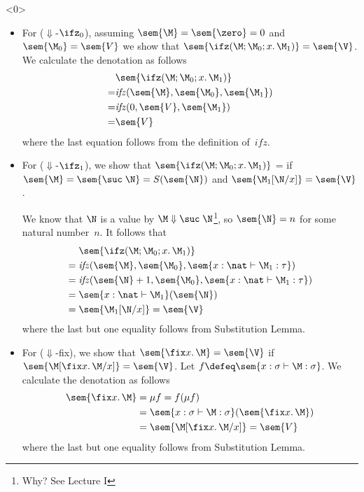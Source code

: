 \begin{frame}<0>
\begin{itemize}
  \item For ($\Downarrow$-$\ifz_0$), assuming $\sem{\M}=\sem{\zero} = 0$
    and $\sem{\M_0} = \sem{V}$ we show that
    $\sem{\ifz(\M; \M_0; x.\, \M_1)} = \sem{\V}$. We calculate the
    denotation as follows
    \begin{align*}
      & \sem{\ifz(\M;\M_0;x.\,\M_1)} \\
         = &\mathit{ifz}(\sem{\M}, \sem{\M_0}, \sem{\M_1}) \\
         = &\mathit{ifz}(0, \sem{V}, \sem{\M_1}) \\
         = &\sem{V}
    \end{align*}
    where the last equation follows from the definition of~$\mathit{ifz}$. 
  \item For ($\Downarrow$-$\ifz_1$), we show that $\sem{\ifz(\M;\M_0;
      x.\,\M_1)}$ =  if $\sem{\M} = \sem{\suc\;\N} = S(\sem{\N})$
    and $\sem{\M_1[\N/x]} = \sem{\V}$.

  We know that $\N$ is a value by $\M\Downarrow\suc\;\N$\footnote{Why? See
    Lecture I}, so $\sem{\N} = n$ for some natural number~$n$. It follows that 
  \begin{align*}
       & \sem{\ifz(\M; \M_0; x.\,\M_1)} \\
     ={} & \mathit{ifz}(\sem{\M}, \sem{\M_0}, \sem{x : \nat\vdash \M_1 :
      \tau}) \\
     ={} & \mathit{ifz}(\sem{\N} + 1, \sem{\M_0}, \sem{x : \nat\vdash \M_1 :
      \tau}) \\
     ={} & \sem{x : \nat \vdash \M_1}(\sem{\N}) \\
     ={} &\sem{\M_1[\N/x]} = \sem{\V}
  \end{align*}
  where the last but one equality follows from Substitution Lemma.

  \item For ($\Downarrow$-fix), we show that $\sem{\fix x.\,\M} = \sem{\V}$ if
    $\sem{\M[\fix x.\,\M/x]} = \sem{\V}$.  Let $f \defeq \sem{x : \sigma \vdash
      \M : \sigma}$.  We
    calculate the denotation as follows
    \begin{align*}
      \sem{\fix x.\,\M}
      & = \mu f = f(\mu f) \\
      & = \sem{x : \sigma \vdash \M : \sigma}(\sem{\fix x.\, \M}) \\
      & = \sem{\M[\fix x.\, \M/x]} = \sem{V}
    \end{align*}
    where the last but one equality follows from Substitution Lemma.
\end{itemize}
\end{frame}

